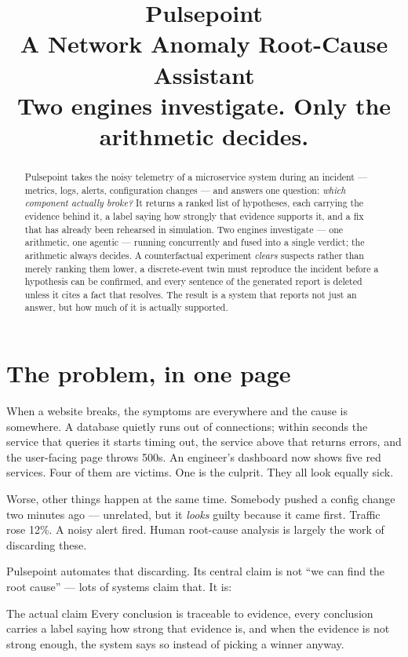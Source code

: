 \documentclass[11pt,a4paper]{article}
\title{\textbf{Pulsepoint}\\[0.3em]
\large A Network Anomaly Root-Cause Assistant\\[0.2em]
\normalsize\color{muted} Two engines investigate. Only the arithmetic decides.}
\author{}
\date{}
\begin{document}
\maketitle
\thispagestyle{empty}

\begin{abstract}
\noindent
Pulsepoint takes the noisy telemetry of a microservice system during an incident
--- metrics, logs, alerts, configuration changes --- and answers one question:
\emph{which component actually broke?} It returns a ranked list of hypotheses,
each carrying the evidence behind it, a label saying how strongly that evidence
supports it, and a fix that has already been rehearsed in simulation. Two engines
investigate --- one arithmetic, one agentic --- running concurrently and fused
into a single verdict; the arithmetic always decides. A counterfactual experiment
\emph{clears} suspects rather than merely ranking them lower, a discrete-event
twin must reproduce the incident before a hypothesis can be confirmed, and every
sentence of the generated report is deleted unless it cites a fact that resolves.
The result is a system that reports not just an answer, but how much of it is
actually supported.
\end{abstract}

\vspace{1em}

\section{The problem, in one page}

When a website breaks, the symptoms are everywhere and the cause is somewhere.
A database quietly runs out of connections; within seconds the service that
queries it starts timing out, the service above that returns errors, and the
user-facing page throws 500s. An engineer's dashboard now shows five red
services. Four of them are victims. One is the culprit. They all look equally
sick.

Worse, other things happen at the same time. Somebody pushed a config change two
minutes ago --- unrelated, but it \emph{looks} guilty because it came first.
Traffic rose 12\%. A noisy alert fired. Human root-cause analysis is largely the
work of discarding these.

Pulsepoint automates that discarding. Its central claim is not ``we can find the
root cause'' --- lots of systems claim that. It is:

\begin{keybox}{The actual claim}
Every conclusion is traceable to evidence, every conclusion carries a label
saying how strong that evidence is, and when the evidence is not strong enough,
the system says so instead of picking a winner anyway.
\end{keybox}
\end{document}
